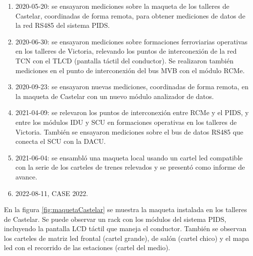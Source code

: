 \begin{enumerate}

\item 2020-05-20: se ensayaron mediciones sobre la maqueta de los talleres de Castelar, coordinadas de forma remota, para obtener mediciones de datos de la red RS485 del sistema PIDS.

\item 2020-06-30: se ensayaron mediciones sobre formaciones ferroviarias operativas en los talleres de Victoria, relevando los puntos de interconexión de la red TCN con el TLCD (pantalla táctil del conductor). Se realizaron también mediciones en el punto de interconexión del bus MVB con el módulo RCMe. 

\item 2020-09-23: se ensayaron nuevas mediciones, coordinadas de forma remota, en la maqueta de Castelar con un nuevo módulo analizador de datos.

\item 2021-04-09: se relevaron los puntos de interconexión entre RCMe y el PIDS, y entre los módulos IDU y SCU en formaciones operativas en los talleres de Victoria. También se ensayaron mediciones sobre el bus de datos RS485 que conecta el SCU con la DACU.

\item 2021-06-04: se ensambló una maqueta local usando un cartel led compatible con la serie de los carteles de trenes relevados y se presentó como informe de avance.

\item 2022-08-11, CASE 2022.

\end{enumerate}


En la figura \ref{fig:maquetaCastelar} se muestra la maqueta instalada en los talleres de Castelar. Se puede observar un rack con los módulos del sistema PIDS, incluyendo la pantalla LCD táctil que maneja el conductor. También se observan los carteles de matriz led frontal (cartel grande), de salón (cartel chico) y el mapa led con el recorrido de las estaciones (cartel del medio).\\
 
